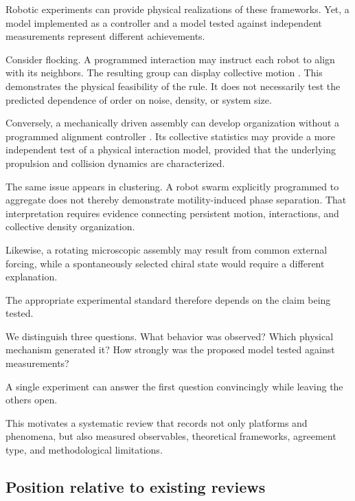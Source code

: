 Robotic experiments
can provide physical
realizations of these
frameworks. Yet,
a model implemented
as a controller
and a model tested
against independent
measurements represent
different achievements.

Consider flocking.
A programmed interaction
may instruct each robot
to align with its
neighbors. The resulting
group can display
collective motion
\cite{Turgut2008selforganizedflocka,Vsrhelyi2018optimizedflockingo,Zhou2024anticipationpromote}.
This demonstrates
the physical feasibility
of the rule.
It does not
necessarily test
the predicted
dependence of
order on noise,
density, or
system size.

Conversely, a
mechanically driven
assembly can
develop organization
without a programmed
alignment controller
\cite{Welch2019activereorientation,Baconnier2022selectiveandcollec,Luo2025flockingphasesepar}.
Its collective
statistics may
provide a more
independent test
of a physical
interaction model,
provided that
the underlying
propulsion and
collision dynamics
are characterized.

The same issue
appears in
clustering.
A robot swarm
explicitly programmed
to aggregate
does not thereby
demonstrate
motility-induced
phase separation.
That interpretation
requires evidence
connecting persistent
motion, interactions,
and collective
density organization.

Likewise, a rotating
microscopic assembly
may result from
common external
forcing, while
a spontaneously
selected chiral
state would
require a
different explanation.

The appropriate
experimental standard
therefore depends
on the claim
being tested.

We distinguish
three questions.
What behavior
was observed?
Which physical
mechanism generated
it? How strongly
was the proposed
model tested
against measurements?

A single experiment
can answer the
first question
convincingly while
leaving the others
open.

This motivates
a systematic review
that records not
only platforms
and phenomena,
but also measured
observables,
theoretical frameworks,
agreement type,
and methodological
limitations.

\subsection{Position relative to existing reviews}
\label{sec:introduction-prior-reviews}

